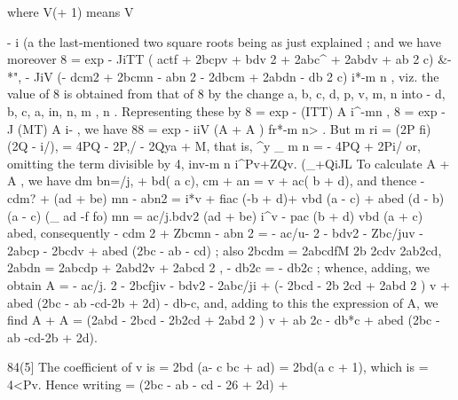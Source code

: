 \documentclass[11pt,a4paper]{book}
\begin{document}
where V(+ 1) means V{- i (a the last-mentioned two square roots being as just explained ; and we have moreover 8 = exp {- JiTT ( actf + 2bcpv + bdv 2 + 2abc^ + 2abdv + ab 2 c)} &-*", {- JiV (- dcm2 + 2bcmn - abn 2 - 2dbcm + 2abdn - db 2 c)} i*-m n , viz. the value of 8 is obtained from that of 8 by the change a, b, c, d, p, v, m, n into - d, b, c, a, in, n, m , n . Representing these by 8 = exp {- (ITT) A} i^-mn , 8 = exp {- J (MT) A } i- , we have 88 = exp {- iiV (A + A )} fr*-m n> . But m ri = (2P fi) (2Q - i/), = 4PQ - 2P,/ - 2Qya + M, that is, ^y _ m n = - 4PQ + 2Pi/ or, omitting the term divisible by 4, inv-m n i^Pv+ZQv. (_\Pv+QiJL To calculate A + A , we have dm bn=/j, + bd( a c), cm + an = v + ac( b + d), and thence - cdm? + (ad + be) mn - abn2 = i*v + fiac (-b + d)+ vbd (a - c) + abed (d - b) (a - c) (_ ad -f fo) mn = ac/j.bdv2 (ad + be) i^v - pac (b + d) vbd (a + c) abed, consequently - cdm 2 + Zbcmn - abn 2 = - ac/u- 2 - bdv2 - Zbc/juv - 2abcp - 2bcdv + abed (2bc - ab - cd) ; also 2bcdm = 2abcdfM 2b 2cdv 2ab2cd, 2abdn = 2abcdp + 2abd2v + 2abcd 2 , - db2c = - db2c ; whence, adding, we obtain A = - ac/j. 2 - 2bcfjiv - bdv2 - 2abc/ji + (- 2bcd - 2b 2cd + 2abd 2 ) v + abed (2bc - ab -cd-2b + 2d) - db-c, and, adding to this the expression of A, we find A + A = (2abd - 2bcd - 2b2cd + 2abd 2 ) v + ab 2c - db*c + abed (2bc - ab -cd-2b + 2d).

84(5] The coefficient of v is = 2bd (a- c bc + ad) = 2bd(a c + 1), which is = 4<Pv. Hence writing = \abcd (2bc - ab - cd - 26 + 2d) + %

}
\end{document}
